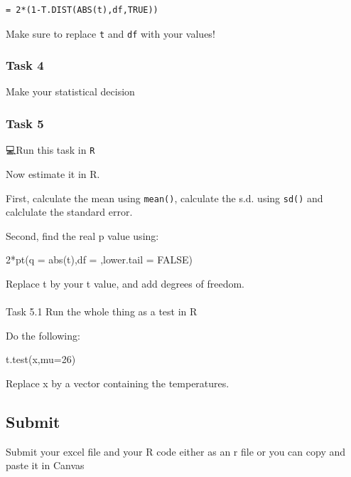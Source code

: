 \documentclass[
  letterpaper,
  DIV=11,
  numbers=noendperiod]{scrartcl}
\makeatletter
\let\oldparagraph\paragraph
\renewcommand{\paragraph}{
    \@ifstar
      \xxxParagraphStar
      \xxxParagraphNoStar
  }
\newcommand{\xxxParagraphStar}[1]{\oldparagraph*{#1}\mbox{}}
\newcommand{\xxxParagraphNoStar}[1]{\oldparagraph{#1}\mbox{}}
\newenvironment{Shaded}{\begin{snugshade}}{\end{snugshade}}
\newcommand{\AttributeTok}[1]{\textcolor[rgb]{0.40,0.45,0.13}{#1}}
\newcommand{\ConstantTok}[1]{\textcolor[rgb]{0.56,0.35,0.01}{#1}}
\newcommand{\DecValTok}[1]{\textcolor[rgb]{0.68,0.00,0.00}{#1}}
\newcommand{\FunctionTok}[1]{\textcolor[rgb]{0.28,0.35,0.67}{#1}}
\newcommand{\NormalTok}[1]{\textcolor[rgb]{0.00,0.23,0.31}{#1}}
\newcommand{\SpecialCharTok}[1]{\textcolor[rgb]{0.37,0.37,0.37}{#1}}
\makeatother
\begin{document}
\begin{verbatim}
= 2*(1-T.DIST(ABS(t),df,TRUE))
\end{verbatim}

Make sure to replace \texttt{t} and \texttt{df} with your values!

\subsubsection{Task 4}\label{task-4}

Make your statistical decision

\subsubsection{Task 5}\label{task-5}

💻Run this task in \texttt{R}

Now estimate it in R.

First, calculate the mean using \texttt{mean()}, calculate the s.d.
using \texttt{sd()} and calclulate the standard error.

Second, find the real p value using:

\begin{Shaded}
\begin{Highlighting}[]
\DecValTok{2}\SpecialCharTok{*}\FunctionTok{pt}\NormalTok{(}\AttributeTok{q =} \FunctionTok{abs}\NormalTok{(t),}\AttributeTok{df =}\NormalTok{ ,}\AttributeTok{lower.tail =} \ConstantTok{FALSE}\NormalTok{)}
\end{Highlighting}
\end{Shaded}

Replace t by your t value, and add degrees of freedom.

\paragraph{Task 5.1 Run the whole thing as a test in
R}\label{task-5.1-run-the-whole-thing-as-a-test-in-r}

Do the following:

\begin{Shaded}
\begin{Highlighting}[]
\FunctionTok{t.test}\NormalTok{(x,}\AttributeTok{mu=}\DecValTok{26}\NormalTok{)}
\end{Highlighting}
\end{Shaded}

Replace x by a vector containing the temperatures.

\subsection{Submit}\label{submit}

Submit your excel file and your R code either as an r file or you can
copy and paste it in Canvas
\end{document}
